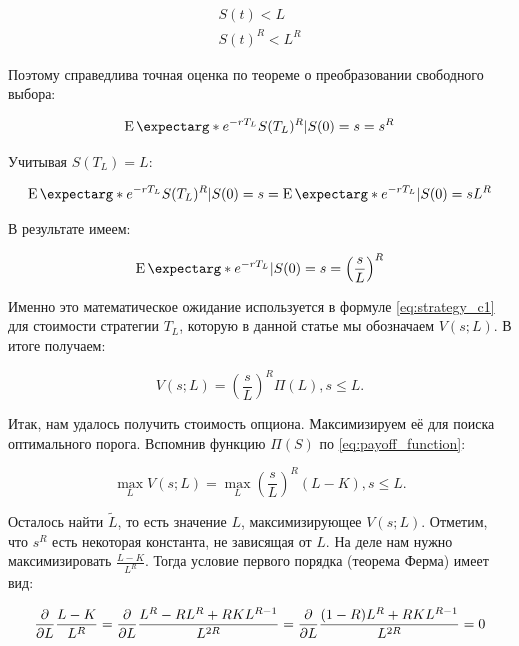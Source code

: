 \documentclass[a4paper,12pt]{article}
\theoremstyle{definition}
\newcommand{\expect}{\operatorname{E}\expectarg}
\begin{document}
\begin{gather*}
    S(t) < L \\
    S(t)^{R} < L^R
\end{gather*}

Поэтому справедлива точная оценка по теореме о преобразовании свободного выбора:

\begin{equation*}
    \expect*{e^{-r T_L} S(T_L)^R | S(0) = s} = s^R
\end{equation*}

Учитывая $S(T_L) = L$:

\begin{equation*}
    \expect*{e^{-r T_L} S(T_L)^R | S(0) = s} = \expect*{e^{-r T_L} | S(0) = s} L^R
\end{equation*}

В результате имеем:

\begin{equation*}
    \expect*{e^{-r T_L} | S(0) = s} = \left(\frac{s}{L}\right)^{R}
\end{equation*}

Именно это математическое ожидание используется в формуле \eqref{eq:strategy_c1} для стоимости стратегии $T_L$, которую в данной статье мы обозначаем $V(s; L)$. В итоге получаем:

\begin{equation}\label{eq:strategy_c1_simplified}
V(s; L) = \left(\frac{s}{L}\right)^{R} \Pi(L), s \le L.
\end{equation}

Итак, нам удалось получить стоимость опциона. Максимизируем её для поиска оптимального порога. Вспомнив функцию $\Pi(S)$ по \eqref{eq:payoff_function}:

\begin{equation*}
\max\limits_{L} V(s; L) = \max\limits_{L} \left(\frac{s}{L}\right)^{R} (L - K), s \le L.
\end{equation*}

Осталось найти $\widetilde{L}$, то есть значение $L$, максимизирующее $V(s; L)$. Отметим, что $s^{R}$ есть некоторая константа, не зависящая от $L$. На деле нам нужно максимизировать $\frac{L - K}{L^R}$. Тогда условие первого порядка (теорема Ферма) имеет вид:

\begin{equation*}
    \pdv{}{L} \frac{L - K}{L^R} = \pdv{}{L} \frac{L^R - R L^R + R K L^{R-1}}{L^{2R}} = \pdv{}{L} \frac{(1 - R)L^R + R K L^{R-1}}{L^{2R}} = 0
\end{equation*}
\end{document}
